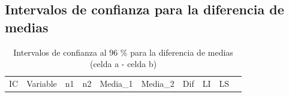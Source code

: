 \documentclass[
  spanish,
  11pt,
]{extarticle}
\begin{document}
\subsection{Intervalos de confianza para la diferencia de
medias}\label{intervalos-de-confianza-para-la-diferencia-de-medias-1}

\begin{longtable}[]{@{}
  >{\raggedright\arraybackslash}p{}
  >{\raggedright\arraybackslash}p{}
  >{\raggedleft\arraybackslash}p{}
  >{\raggedleft\arraybackslash}p{}
  >{\raggedleft\arraybackslash}p{}
  >{\raggedleft\arraybackslash}p{}
  >{\raggedleft\arraybackslash}p{}
  >{\raggedleft\arraybackslash}p{}
  >{\raggedleft\arraybackslash}p{}
  >{\raggedright\arraybackslash}p{}@{}}
\caption{Intervalos de confianza al 96 \% para la diferencia de medias
(celda a - celda b)}\tabularnewline
\toprule\noalign{}
\begin{minipage}[b]{\linewidth}\raggedright
IC
\end{minipage} & \begin{minipage}[b]{\linewidth}\raggedright
Variable
\end{minipage} & \begin{minipage}[b]{\linewidth}\raggedleft
n1
\end{minipage} & \begin{minipage}[b]{\linewidth}\raggedleft
n2
\end{minipage} & \begin{minipage}[b]{\linewidth}\raggedleft
Media\_1
\end{minipage} & \begin{minipage}[b]{\linewidth}\raggedleft
Media\_2
\end{minipage} & \begin{minipage}[b]{\linewidth}\raggedleft
Dif
\end{minipage} & \begin{minipage}[b]{\linewidth}\raggedleft
LI
\end{minipage} & \begin{minipage}[b]{\linewidth}\raggedleft
LS
\end{minipage} & \begin{minipage}[b]{\linewidth}\raggedright

\end{minipage}
\end{longtable}
\end{document}

